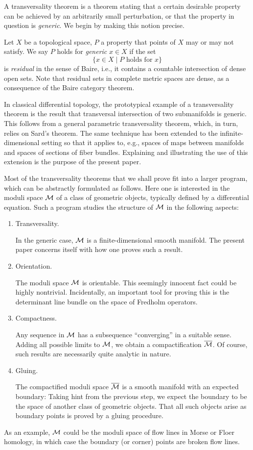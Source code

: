 A transversality theorem is a theorem stating that a certain desirable 
property can be achieved by an arbitrarily small perturbation, or that 
the property in question is \textit{generic}. 
We begin by making this notion precise. 

Let $X$ be a topological space, $P$ a property that points of $X$ may 
or may not satisfy. We say $P$ holds for \textit{generic} $x \in X$ if 
the set 
\[
    \{ x \in X \mid P \text{ holds for } x \}
\]
is \textit{residual} in the sense of Baire, i.e., it contains a countable intersection 
of dense open sets. 
Note that residual sets in complete metric spaces are dense, 
as a consequence of the Baire category theorem.

In classical differential topology, the prototypical example of a 
transversality theorem is the result that transversal intersection of 
two submanifolds is generic. 
This follows from a general parametric transversality theorem, 
which, in turn, relies on Sard's theorem. 
The same technique has been extended to the infinite-dimensional setting 
so that it applies to, e.g., spaces of maps between manifolds and spaces 
of sections of fiber bundles.
Explaining and illustrating the use of this extension is the purpose of the present paper.

Most of the transversality theorems that we shall prove fit into a larger 
program, which can be abstractly formulated as follows. 
Here one is interested in the moduli space ${\mathcal{M}}$ of a class of geometric 
objects, typically defined by a differential equation. Such a program 
studies the structure of ${\mathcal{M}}$ in the following aspects:

\begin{enumerate}
    \item Transversality.
		
        In the generic case, ${\mathcal{M}}$ is a finite-dimensional smooth manifold. 
        The present paper concerns itself with how one proves such a result.
    
    \item Orientation.
		
        The moduli space ${\mathcal{M}}$ is orientable.
		This seemingly innocent fact could be highly nontrivial. 
        Incidentally, an important tool for proving this is the determinant 
		line bundle on the space of Fredholm operators.
    
    \item Compactness.
		
        Any sequence in ${\mathcal{M}}$ has a subsequence
        ``converging'' in a suitable sense. 
        Adding all possible limits to ${\mathcal{M}}$, 
        we obtain a compactification $\overline{{\mathcal{M}}}$. 
        Of course, such results are necessarily quite analytic in nature.
		
    \item Gluing.
		 
		The compactified moduli space $\overline{{\mathcal{M}}}$ is a smooth manifold 
		with an expected boundary: 
		Taking hint from the previous step, we expect the boundary to be 
		the space of another class of geometric objects. 
		That all such objects arise as boundary points 
		is proved by a gluing procedure.
\end{enumerate}

As an example, ${\mathcal{M}}$ could be the moduli space of flow lines in Morse 
or Floer homology, in which case the boundary (or corner) points are 
broken flow lines.